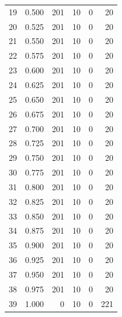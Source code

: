 \documentclass[a4paper,twoside,12pt]{book}
\begin{document}
\begin{appendices}
\begin{table}
\begin{tabular}{lrrrrr}
		19 &  0.500 &       201 &        10 &               0 &              20 \\
		20 &  0.525 &       201 &        10 &               0 &              20 \\
		21 &  0.550 &       201 &        10 &               0 &              20 \\
		22 &  0.575 &       201 &        10 &               0 &              20 \\
		23 &  0.600 &       201 &        10 &               0 &              20 \\
		24 &  0.625 &       201 &        10 &               0 &              20 \\
		25 &  0.650 &       201 &        10 &               0 &              20 \\
		26 &  0.675 &       201 &        10 &               0 &              20 \\
		27 &  0.700 &       201 &        10 &               0 &              20 \\
		28 &  0.725 &       201 &        10 &               0 &              20 \\
		29 &  0.750 &       201 &        10 &               0 &              20 \\
		30 &  0.775 &       201 &        10 &               0 &              20 \\
		31 &  0.800 &       201 &        10 &               0 &              20 \\
		32 &  0.825 &       201 &        10 &               0 &              20 \\
		33 &  0.850 &       201 &        10 &               0 &              20 \\
		34 &  0.875 &       201 &        10 &               0 &              20 \\
		35 &  0.900 &       201 &        10 &               0 &              20 \\
		36 &  0.925 &       201 &        10 &               0 &              20 \\
		37 &  0.950 &       201 &        10 &               0 &              20 \\
		38 &  0.975 &       201 &        10 &               0 &              20 \\
		39 &  1.000 &         0 &        10 &               0 &             221 \\
		\bottomrule
	\end{tabular}		
\end{table}


\end{appendices}
\end{document}
